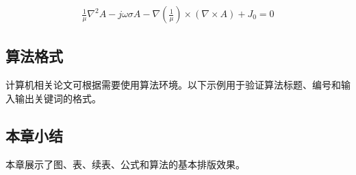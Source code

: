 \begin{eqnarray}
\frac{1}{\mu} \nabla^2A - j \omega \sigma A -\nabla(\frac{1}{\mu}) \times(\nabla \times A)+J_0=0
\end{eqnarray}

\subsection{算法格式}
\thesisbodyfont
计算机相关论文可根据需要使用算法环境。以下示例用于验证算法标题、编号和输入输出关键词的格式。

\begin{algorithm}[htbp]
\caption{模板算法示例}
\end{algorithm}

\subsection{本章小结}
\thesisbodyfont
本章展示了图、表、续表、公式和算法的基本排版效果。
